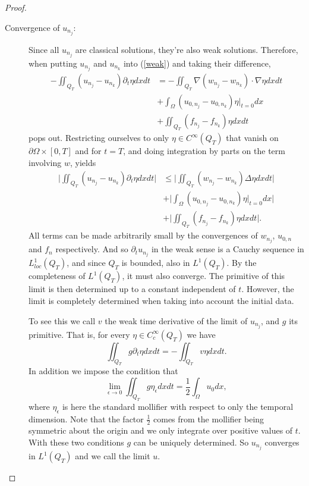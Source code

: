 \documentclass[11pt, a4paper]{article}
\begin{document}
\begin{proof}
\begin{description}
	\item[Convergence of $u_{n_j}$:] Since all $u_{n_j}$ are classical solutions, they're also weak solutions. Therefore, when putting $u_{n_j}$ and $u_{n_k}$ into (\ref{weak}) and taking their difference, 
	\begin{align*}
	-\iint_{Q_T}(u_{n_j} - u_{n_k})\partial_t \eta dxdt &= -\iint_{Q_T}\nabla(w_{n_j} - w_{n_k})\cdot \nabla \eta dxdt \\
	&+ \int_\Omega (u_{0,n_j} - u_{0,n_k})\eta\big|_{t=0}dx \\
	&+ \iint_{Q_T}(f_{n_j} - f_{n_k})\eta dxdt 
	\end{align*}	 
	pops out. Restricting ourselves to only $\eta \in C^\infty(Q_T)$ that vanish on $\partial \Omega \times [0,T]$ and for $t=T$, and doing integration by parts on the term involving $w$, yields
	\begin{align*}
	\bigg|\iint_{Q_T}(u_{n_j} - u_{n_k})\partial_t \eta dxdt \bigg| &\leq \bigg|\iint_{Q_T} (w_{n_j} - w_{n_k})\Delta\eta dxdt \bigg| \\
	&+ \bigg| \int_\Omega (u_{0,n_j} - u_{0,n_k})\eta\big|_{t=0} dx \bigg| \\
	 &+  \bigg|\iint_{Q_T}(f_{n_j} - f_{n_k})\eta dxdt\bigg|.
	\end{align*}
	 All terms can be made arbitrarily small by the convergences of $w_{n_j}$, $u_{0,n}$ and $f_n$ respectively. And so $\partial_t u_{n_j}$ in the weak sense is a Cauchy sequence in $L^1_{loc}(Q_T)$, and since $Q_T$ is bounded, also in $L^1(Q_T)$. By the completeness of $L^1(Q_T)$, it must also converge. The primitive of this limit is then determined up to a constant independent of $t$. However, the limit is completely determined when taking into account the initial data.
	 
	 To see this we call $v$ the weak time derivative of the limit of $u_{n_j}$, and $g$ its primitive. That is, for every $\eta \in C^\infty_c (Q_T)$ we have
	 \begin{equation*}
	 \iint_{Q_T} g\partial_t\eta dxdt = -\iint_{Q_T}v\eta dxdt.
	 \end{equation*}
	 In addition we impose the condition that
	 \begin{equation*}
	 \lim_{\epsilon \to 0} \iint_{Q_T}g \eta_\epsilon dxdt = \frac{1}{2}\int_\Omega u_0dx,
	 \end{equation*}
	 where $\eta_\epsilon$ is here the standard mollifier with respect to only the temporal dimension. Note that the factor $\frac{1}{2}$ comes from the mollifier being symmetric about the origin and we only integrate over positive values of $t$. With these two conditions $g$ can be uniquely determined. So $u_{n_j}$ converges in $L^1(Q_T)$ and we call the limit $u$.	 
	 

\end{description}
\end{proof}
\end{document}
